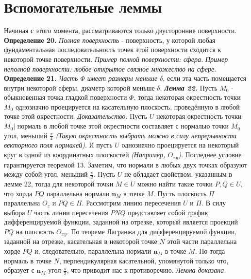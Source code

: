 \documentclass[12pt,a4paper]{article}
\begin{document}
	\section{Вспомогательные леммы}
	Начиная с этого момента, рассматриваются только двусторонние поверхности.
	\newline
	\newline
	\textbf{Определение 20.} \textit{Полная поверхность} - поверхность, у которой любая фундаментальная последовательность точек этой поверхности сходится к некоторой точке поверхности.
	\newline
	\textit{Пример полной поверхности: сфера.}
	\newline
	\textit{Пример неполной поверхности: любое открытое связное множество на сфере.}
	\newline
	\newline
	\textbf{Определение 21.} \textit{Часть $\Phi$ имеет размеры меньше $\delta$}, если эта часть помещается внутри некоторой сферы, диаметр которой меньше $\delta$.
	\newline
	\newline
	\textit{\textbf{Лемма 22.}} Пусть $M_{0}$ - обыкновенная точка гладкой поверхности $\Phi$, тогда некоторая окрестность точки $M_{0}$ однозначно проецируется на касательную плоскость, проведённую в любой точке этой окрестности.
	\newline
	\newline
	\textit{Доказательство.}
	\newline
	Пусть $U$ некоторая окрестность точки $M_{0} | $ нормаль в любой точке этой окрестности составляет с нормалью точки $M_{0}$ угол, меньший $\frac{\pi}{4}$ \textit{(Такую окрестность выбрать можно в силу непрерывности векторного поля нормалей)}. И пусть $U$ однозначно проецируется на некоторый круг в одной из координатных плоскостей \textit{(Например, $O_{xy}$)}. Последнее условие гарантируется теоремой 13. Заметим, что нормали в любых двух точках образуют между собой угол, меньший $\frac{\pi}{2}$.
	\newline
	Пусть $U$ не обладает свойством, указанным в лемме 22, тогда для некоторой точки $M \in U$ можно найти такие точки $P, Q \in U$, что хорда $PQ$ параллельна нормали $\textbf{n}_{M}$ в точке $M$. Пусть плоскость $\Pi$ параллельна $O_{z}$ и $PQ \in \Pi$. Рассмотрим линию пересечения $U$ и $\Pi$. В силу выбора $U$ часть линии пересечения $PNQ$ представляет собой график дифференцируемой функции, заданной на отрезке, который является проекций $PQ$ на плоскость $O_{xy}$. По теореме Лагранжа для дифференцируемой функции, заданной на отрезке, касательная в некоторой точке $N$ этой части параллельна хорде $PQ$ и, следовательно, параллельна нормали $\textbf{n}_{M}$ в точке $M$. Но тогда нормаль в точке $N$, перпендикулярная касательной, упомянутой только что, образует с $\textbf{n}_{M}$ угол $\frac{\pi}{2}$, что приводит нас к противоречию. \textit{Лемма доказана.}
\end{document}
